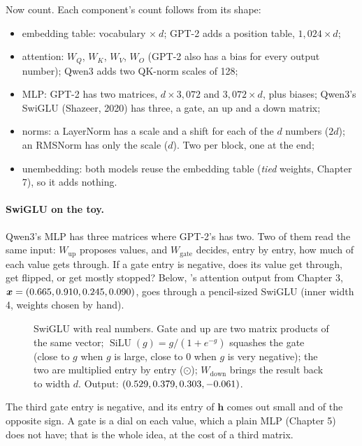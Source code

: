 Now count. Each component's count follows from its shape:
\begin{itemize}
\item embedding table: vocabulary $\times\ d$; GPT-2 adds a position table, $1{,}024\times d$;
\item attention: $W_Q$, $W_K$, $W_V$, $W_O$ (GPT-2 also has a bias for every output number); Qwen3 adds two
QK-norm scales of 128;
\item MLP: GPT-2 has two matrices, $d\times3{,}072$ and $3{,}072\times d$, plus biases; Qwen3's SwiGLU
(Shazeer, 2020) has three, a gate, an up and a down matrix;
\item norms: a LayerNorm has a scale and a shift for each of the $d$ numbers ($2d$); an RMSNorm has only
the scale ($d$). Two per block, one at the end;
\item unembedding: both models reuse the embedding table (\emph{tied} weights, Chapter 7), so it adds nothing.
\end{itemize}

\paragraph{SwiGLU on the toy.} Qwen3's MLP has three matrices where GPT-2's has two. Two of them read the
same input: $W_{\text{up}}$ proposes values, and $W_{\text{gate}}$ decides, entry by entry, how much of each
value gets through. \Predict If a gate entry is negative, does its value get through, get flipped, or get
mostly stopped? Below, 's attention output from Chapter 3, $\bm{x}=(0.665, 0.910, 0.245, 0.090)$, goes through a
pencil-sized SwiGLU (inner width 4, weights chosen by hand).

\begin{figure}[!htb]
\centering

\caption{SwiGLU with real numbers. Gate and up are two matrix products of the same vector; $\operatorname{SiLU}(g)
= g/(1+e^{-g})$ squashes the gate (close to $g$ when $g$ is large, close to 0 when $g$ is very negative); the
two are multiplied entry by entry ($\odot$); $W_{\text{down}}$ brings the result back to width $d$. Output:
$(0.529, 0.379, 0.303, -0.061)$.}
\end{figure}

\Sanity The third gate entry is negative, and its entry of $\bm{h}$ comes out small and of the opposite sign.
A gate is a dial on each value, which a plain MLP (Chapter 5) does not have; that is the whole idea, at the cost
of a third matrix.


